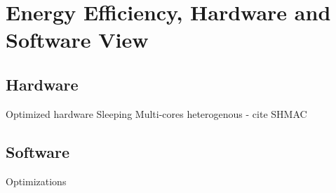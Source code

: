 \chapter{Energy Efficiency, Hardware and Software View}
\label{ch:chapter2}

\section{Hardware}
Optimized hardware
Sleeping
Multi-cores heterogenous - cite SHMAC

\section{Software}
Optimizations 